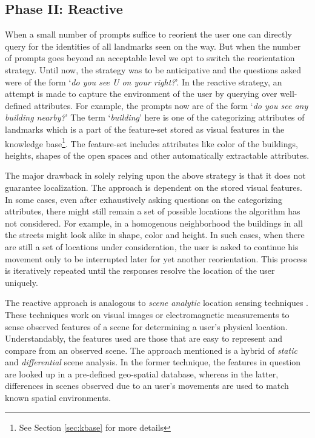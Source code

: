 \documentclass{iitkthesis}
\begin{document}
\subsection*{Phase II: Reactive}
When a small number of prompts suffice to reorient the user one can 
directly query for the identities of all landmarks seen on the way.
But when the number of prompts goes beyond an acceptable level
we opt to switch the reorientation strategy. Until now, the strategy was 
to be anticipative and the questions asked were of the form `\textit{do 
you see U on your right?}'. In the reactive strategy, an attempt is made to 
capture the environment of the user by querying over well-defined 
attributes. For example, the prompts now are of the form `\textit{do 
you see any building nearby?}' The term `\textit{building}' here is one 
of the categorizing attributes of landmarks which is a part of the 
feature-set stored as visual features in the knowledge base\footnote{See Section \ref{sec:kbase} for more details}. The feature-set 
includes attributes like color of the buildings, heights, shapes of the 
open spaces and other automatically extractable attributes.

The major drawback in solely relying upon the above strategy is that it 
does not guarantee localization. The approach is dependent on the stored 
visual features. In some cases, even after exhaustively asking questions 
on the categorizing attributes, there might still remain a set of possible 
locations the algorithm has not considered. For example, in a 
homogenous neighborhood the buildings in all the streets might look alike in 
shape, color and height. In such cases, when there are still a set of 
locations under consideration, the user is asked to continue his movement 
only to be interrupted later for yet another reorientation. This process is
iteratively repeated until the responses resolve the location of the user uniquely.

The reactive approach is analogous to \textit{scene analytic} 
location sensing techniques \cite{hightower}. These techniques work on 
visual images or electromagnetic measurements to sense observed features 
of a scene for determining a user's physical location. Understandably, 
the features used are those that are easy to represent and compare from 
an observed scene. The approach mentioned is a hybrid of \textit{static} 
and \textit{differential} scene analysis. In the former technique, the
features in question are looked up in a pre-defined geo-spatial database, 
whereas in the latter, differences in scenes observed due to an user's 
movements are used to match known spatial environments.
\end{document}
